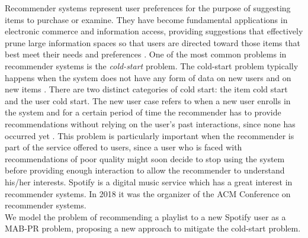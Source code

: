 Recommender systems represent user preferences for the purpose of suggesting items to purchase or examine. They have become fundamental applications in electronic commerce and information access, providing suggestions that effectively prune large information spaces so that users are directed toward those items that best meet their needs and preferences \citep{recsys1}. One of the most common problems in recommender systems is the \emph{cold-start} problem. The cold-start problem typically happens when the system does not have any form of data on new users and on
new items \citep{recsys2}. There are two distinct categories of cold start: the item cold start and the user cold start. The new user case refers to when a new user enrolls in the system and for a certain period of time the recommender has to provide recommendations without relying on the user's past interactions, since none has occurred yet \citep{recsys3}. This problem is particularly important when the recommender is part of the service offered to users, since a user who is faced with recommendations of poor quality might soon decide to stop using the system before providing enough interaction to allow the recommender to understand his/her interests. Spotify is a digital music service which has a great interest in recommender systems. In 2018 it was the organizer of the ACM Conference on recommender systems.\\
We model the problem of recommending a playlist to a new Spotify user as a MAB-PR problem, proposing a new approach to mitigate the cold-start problem.

